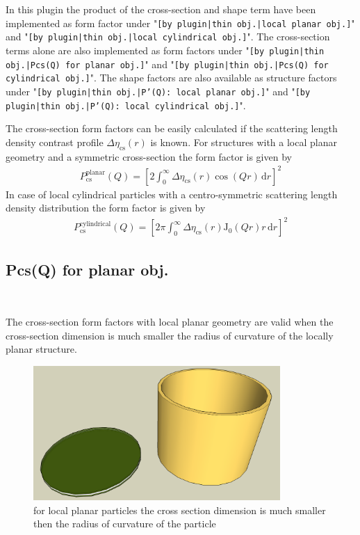 In this plugin the product of the cross-section and shape term
have been implemented as form factor under "\texttt{[by
plugin|thin obj.|local planar obj.]}" and "\texttt{[by
plugin|thin obj.|local cylindrical obj.]}". The
cross-section terms alone are also implemented as form factors
under "\texttt{[by plugin|thin obj.|Pcs(Q) for planar obj.]}"
and "\texttt{[by plugin|thin obj.|Pcs(Q) for cylindrical
obj.]}". The shape factors are also available as structure factors
under "\texttt{[by plugin|thin obj.|P'(Q): local planar
obj.]}" and "\texttt{[by plugin|thin obj.|P'(Q): local
cylindrical obj.]}".

The cross-section form factors can be easily calculated if the
scattering length density contrast profile
$\Delta\eta_\textrm{cs}(r)$ is known. For structures with a local
planar geometry and a symmetric cross-section the form factor is
given by
\begin{align}
P_\textrm{cs}^\textrm{planar} (Q) = \left[2\int_0^\infty
\Delta\eta_\textrm{cs}(r) \cos(Qr) \, \textrm{d}r\right]^2
\label{Pcs:planar}
\end{align}
In case of local cylindrical particles with a centro-symmetric
scattering length density distribution the form factor is given by
\begin{align}
P_\textrm{cs}^\textrm{cylindrical} (Q) = \left[2\pi\int_0^\infty
\Delta\eta_\textrm{cs}(r) \textrm{J}_0(Qr)r \,
\textrm{d}r\right]^2 \label{Pcs:cylindrical}
\end{align}

\clearpage
\subsection{Pcs(Q) for planar obj.} ~\\
\label{plugin:Pcs4planar}

The cross-section form factors with local planar geometry are valid
when the cross-section dimension is much smaller the radius of curvature
of the locally planar structure.
\begin{figure}[htb]
\begin{center}
\includegraphics[width=0.838\textwidth,height=0.456\textwidth]{../images/form_factor/anisotropic/localplanar.png}
\end{center}
\caption{for local planar particles the cross section dimension is much smaller then the
radius of curvature of the particle}
\label{fig:localplanar}
\end{figure}

